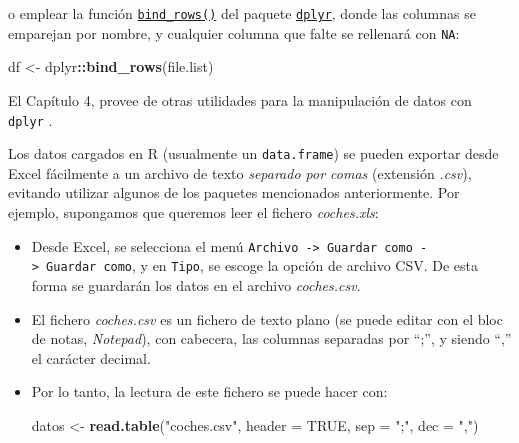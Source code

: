 \documentclass[
]{book}
\newenvironment{Shaded}{\begin{snugshade}}{\end{snugshade}}
\newcommand{\AttributeTok}[1]{\textcolor[rgb]{0.13,0.29,0.53}{#1}}
\newcommand{\ConstantTok}[1]{\textcolor[rgb]{0.56,0.35,0.01}{#1}}
\newcommand{\FunctionTok}[1]{\textcolor[rgb]{0.13,0.29,0.53}{\textbf{#1}}}
\newcommand{\NormalTok}[1]{#1}
\newcommand{\OtherTok}[1]{\textcolor[rgb]{0.56,0.35,0.01}{#1}}
\newcommand{\SpecialCharTok}[1]{\textcolor[rgb]{0.81,0.36,0.00}{\textbf{#1}}}
\newcommand{\StringTok}[1]{\textcolor[rgb]{0.31,0.60,0.02}{#1}}
\begin{document}
o emplear la función \href{https://www.rdocumentation.org/packages/dplyr/versions/0.7.8/topics/bind}{\texttt{bind\_rows()}}
del paquete \href{https://dplyr.tidyverse.org}{\texttt{dplyr}}, donde las columnas se emparejan por nombre, y cualquier columna que falte se rellenará con \texttt{NA}:

\begin{Shaded}
\begin{Highlighting}[]
\NormalTok{df }\OtherTok{\textless{}{-}}\NormalTok{ dplyr}\SpecialCharTok{::}\FunctionTok{bind\_rows}\NormalTok{(file.list)}
\end{Highlighting}
\end{Shaded}

El Capítulo 4, provee de otras utilidades para la manipulación de datos con \texttt{dplyr} \citep{R-dplyr}.

Los datos cargados en R (usualmente un \texttt{data.frame}) se pueden exportar desde Excel fácilmente a un archivo de texto \emph{separado por comas} (extensión \emph{.csv}), evitando utilizar algunos de los paquetes mencionados anteriormente.
Por ejemplo, supongamos que queremos leer el fichero \emph{coches.xls}:

\begin{itemize}
\item
  Desde Excel, se selecciona el menú \texttt{Archivo\ -\textgreater{}\ Guardar\ como\ -\textgreater{}\ Guardar\ como}, y en \texttt{Tipo}, se escoge la opción de archivo CSV. De esta forma se guardarán los datos en el archivo \emph{coches.csv}.
\item
  El fichero \emph{coches.csv} es un fichero de texto plano (se puede
  editar con el bloc de notas, \emph{Notepad}), con cabecera, las columnas separadas por ``;'', y siendo ``,'' el carácter decimal.
\item
  Por lo tanto, la lectura de este fichero se puede hacer con:

\begin{Shaded}
\begin{Highlighting}[]
\NormalTok{datos }\OtherTok{\textless{}{-}} \FunctionTok{read.table}\NormalTok{(}\StringTok{"coches.csv"}\NormalTok{, }\AttributeTok{header =} \ConstantTok{TRUE}\NormalTok{, }
                    \AttributeTok{sep =} \StringTok{";"}\NormalTok{, }\AttributeTok{dec =} \StringTok{","}\NormalTok{)}
\end{Highlighting}
\end{Shaded}
\end{itemize}
\end{document}
